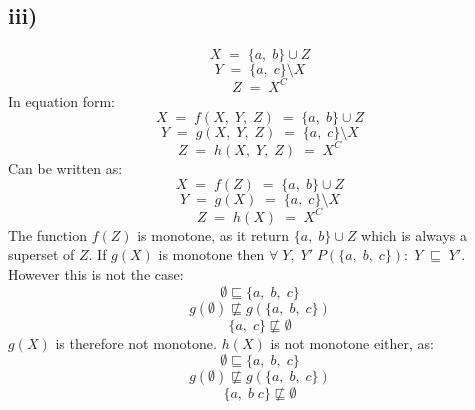 \documentclass{article}
\begin{document}
\subsection*{iii)}
$$X\;=\;\{a,\;b\}\cup Z$$
$$Y\;=\;\{a,\;c\}\setminus X$$
$$Z\;=\;X^C$$
In equation form:
$$X\;=\;f(X,\;Y,\;Z)\;=\;\{a,\;b\}\cup Z$$
$$Y\;=\;g(X,\;Y,\;Z)\;=\;\{a,\;c\}\setminus X$$
$$Z\;=\;h(X,\;Y,\;Z)\;=\;X^C$$
Can be written as:
$$X\;=\;f(Z)\;=\;\{a,\;b\}\cup Z$$
$$Y\;=\;g(X)\;=\;\{a,\;c\}\setminus X$$
$$Z\;=\;h(X)\;=\;X^C$$
The function $f(Z)$ is monotone, as it return $\{a,\;b\}\cup Z$ which is always a superset of $Z$. If $g(X)$ is monotone then $\forall\;Y,\;Y'\;P(\{a,\;b,\;c\}):\;Y\;\sqsubseteq\;Y'$. However this is not the case:
$$\emptyset\sqsubseteq \{a,\;b,\;c\}$$
$$g(\emptyset)\not\sqsubseteq g(\{a,\;b,\;c\})$$
$$\{a,\;c\}\not\sqsubseteq \emptyset$$
$g(X)$ is therefore not monotone. $h(X)$ is not monotone either, as:
$$\emptyset\sqsubseteq \{a,\;b,\;c\}$$
$$g(\emptyset)\not\sqsubseteq g(\{a,\;b,\;c\})$$
$$\{a,\;b\;c\}\not\sqsubseteq \emptyset$$
\end{document}
